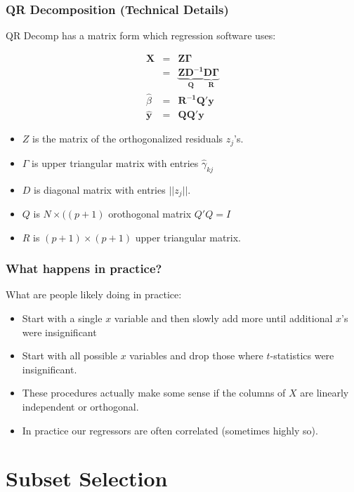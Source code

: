 \begin{frame}
\frametitle{QR Decomposition (Technical Details)}
QR Decomp has a matrix form which regression software uses:

\begin{eqnarray*}
\mathbf{X} &=& \mathbf{Z \Gamma} \\
    &=& \mathbf{\underbrace{Z D^{-1}}_{Q} \underbrace{D \Gamma}_{R}} \\
    \hat{\beta} &=& \mathbf{R^{-1} Q' y}\\
    \hat{\mathbf{y}} &=& \mathbf{Q Q'} \mathbf{y}
\end{eqnarray*}
\begin{itemize}
\item $Z$ is the matrix of the orthogonalized residuals $z_j$'s.
\item $\Gamma$ is upper triangular matrix with entries $\hat{\gamma}_{kj}$
\item $D$ is diagonal matrix with entries $|| z_j ||$.
\item $Q$ is $N \times ((p+1)$ orothogonal matrix $Q'Q = I$ 
\item $R$ is $(p+1) \times (p+1)$ upper triangular matrix.
\end{itemize}
\end{frame}


\begin{frame}
\frametitle{What happens in practice?}
What are people likely doing in practice:
\begin{itemize}
\item Start with a single $x$ variable and then slowly add more until additional $x$'s were insignificant
\item Start with all possible $x$ variables and drop those where $t$-statistics were insignificant.
\item These procedures actually make some sense if the columns of $X$ are \alert{linearly independent} or \alert{orthogonal}.
\item In practice our regressors are often correlated (sometimes highly so).
\end{itemize}
\end{frame}
    

\section{Subset Selection}

